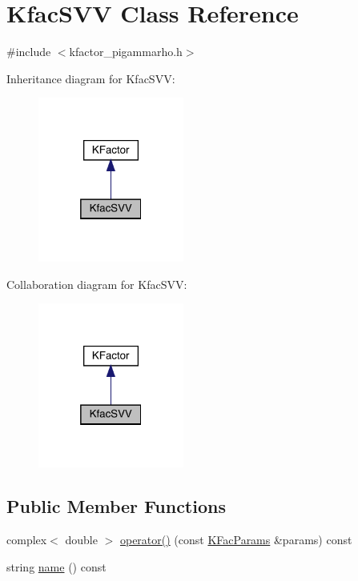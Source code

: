 \hypertarget{classKfacSVV}{}\section{Kfac\+S\+VV Class Reference}
\label{classKfacSVV}


{\ttfamily \#include $<$kfactor\+\_\+pigammarho.\+h$>$}



Inheritance diagram for Kfac\+S\+VV\+:
\nopagebreak
\begin{figure}[H]
\begin{center}
\leavevmode
\includegraphics[width=136pt]{d9/d5e/classKfacSVV__inherit__graph}
\end{center}
\end{figure}


Collaboration diagram for Kfac\+S\+VV\+:
\nopagebreak
\begin{figure}[H]
\begin{center}
\leavevmode
\includegraphics[width=136pt]{d5/d86/classKfacSVV__coll__graph}
\end{center}
\end{figure}
\subsection*{Public Member Functions}
\begin{DoxyCompactItemize}
\item 
complex$<$ double $>$ \mbox{\hyperlink{classKfacSVV_abc4b565ae1fbf1109bbed4b05b3d5ee7}{operator()}} (const \mbox{\hyperlink{classKFacParams}{K\+Fac\+Params}} \&params) const
\item 
string \mbox{\hyperlink{classKfacSVV_ad7ab40ec924a678cd785a9743e676d6c}{name}} () const
\end{DoxyCompactItemize}



